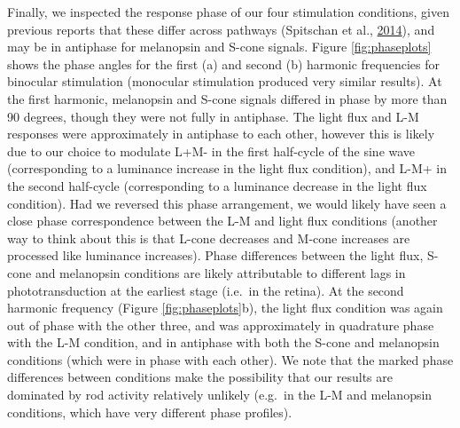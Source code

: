 \documentclass[
]{article}
\begin{document}
Finally, we inspected the response phase of our four stimulation conditions, given previous reports that these differ across pathways (Spitschan et al., \protect\hyperlink{ref-Spitschan2014}{2014}), and may be in antiphase for melanopsin and S-cone signals. Figure \ref{fig:phaseplots} shows the phase angles for the first (a) and second (b) harmonic frequencies for binocular stimulation (monocular stimulation produced very similar results). At the first harmonic, melanopsin and S-cone signals differed in phase by more than 90 degrees, though they were not fully in antiphase. The light flux and L-M responses were approximately in antiphase to each other, however this is likely due to our choice to modulate L+M- in the first half-cycle of the sine wave (corresponding to a luminance increase in the light flux condition), and L-M+ in the second half-cycle (corresponding to a luminance decrease in the light flux condition). Had we reversed this phase arrangement, we would likely have seen a close phase correspondence between the L-M and light flux conditions (another way to think about this is that L-cone decreases and M-cone increases are processed like luminance increases). Phase differences between the light flux, S-cone and melanopsin conditions are likely attributable to different lags in phototransduction at the earliest stage (i.e.~in the retina). At the second harmonic frequency (Figure \ref{fig:phaseplots}b), the light flux condition was again out of phase with the other three, and was approximately in quadrature phase with the L-M condition, and in antiphase with both the S-cone and melanopsin conditions (which were in phase with each other). We note that the marked phase differences between conditions make the possibility that our results are dominated by rod activity relatively unlikely (e.g.~in the L-M and melanopsin conditions, which have very different phase profiles).
\end{document}

